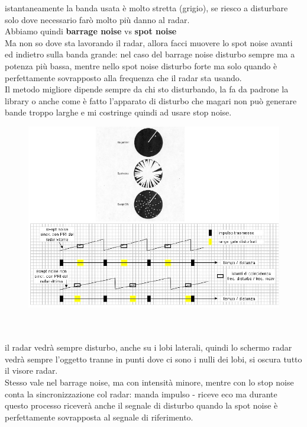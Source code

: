 \documentclass[oneside, 12pt]{extbook}
\begin{document}
istantaneamente la banda usata è molto stretta (grigio), se riesco a disturbare solo dove necessario farò molto più danno al radar.\\
Abbiamo quindi \textbf{barrage noise} vs \textbf{spot noise}\\
Ma non so dove sta lavorando il radar, allora facci muovere lo spot noise avanti ed indietro sulla banda grande: nel caso del barrage noise disturbo sempre ma a potenza più bassa, mentre nello spot noise disturbo forte ma solo quando è perfettamente sovrapposto alla frequenza che il radar sta usando.\\
Il metodo migliore dipende sempre da chi sto disturbando, la fa da padrone la library o anche come è fatto l'apparato di disturbo che magari non può generare bande troppo larghe e mi costringe quindi ad usare stop noise.\\
\begin{figure}[!h]
	\includegraphics[scale=0.4]{immagini/localization/jammin-on-radar.png}
\end{figure}\\\\
il radar vedrà sempre disturbo, anche su i lobi laterali, quindi lo schermo radar vedrà sempre l'oggetto tranne in punti dove ci sono i nulli dei lobi, si oscura tutto il visore radar.\\
Stesso vale nel barrage noise, ma con intensità minore, mentre con lo stop noise conta la sincronizzazione col radar: manda impulso - riceve eco ma durante questo processo riceverà anche il segnale di disturbo quando la spot noise è perfettamente sovrapposta al segnale di riferimento.\\
\end{document}
